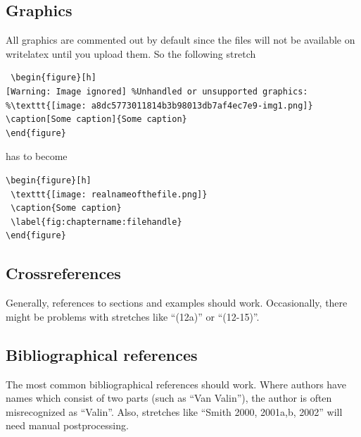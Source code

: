 \subsection{Graphics}
All graphics are commented out by default since the files will not be available on writelatex until you upload them. So the following stretch

\begin{verbatim}
 \begin{figure}[h]
[Warning: Image ignored] %Unhandled or unsupported graphics:
%\texttt{[image: a8dc5773011814b3b98013db7af4ec7e9-img1.png]}
\caption[Some caption]{Some caption}
\end{figure}
\end{verbatim}

has to become


\begin{verbatim}
\begin{figure}[h]
 \texttt{[image: realnameofthefile.png]}
 \caption{Some caption}
 \label{fig:chaptername:filehandle}
\end{figure}
\end{verbatim}

\subsection{Crossreferences}
Generally, references to sections and examples should work. Occasionally, there might be problems with stretches like ``(12a)'' or ``(12-15)''.

\subsection{Bibliographical references}
The most common bibliographical references should work. Where authors have names which consist of two parts (such as ``Van Valin''), the author is often misrecognized as ``Valin''. Also, stretches like ``Smith 2000, 2001a,b, 2002'' will need manual postprocessing. 




